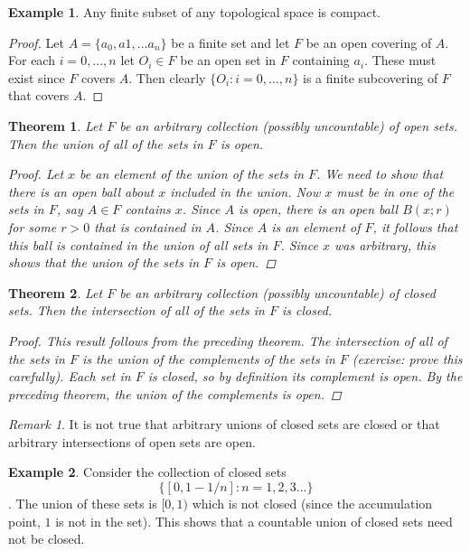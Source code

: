 \documentclass[11pt,a4paper]{report}
\theoremstyle{plain}
\newtheorem{thm}{Theorem}[section]
\theoremstyle{definition}
\newtheorem{exmp}{Example}[section]
\theoremstyle{remark}
\newtheorem*{rem}{Remark}
\begin{document}
\begin{exmp}
Any finite subset of any topological space is compact.
\begin{proof}
Let $A = \{a_0, a1, ... a_n\}$ be a finite set and let $F$ be an open covering of $A$.  For each $i = 0, ..., n$ let $O_i \in F$ be an open set in $F$ containing $a_i$.  These must exist since $F$ covers $A$.  Then clearly $\{O_i \colon i = 0, ..., n\}$ is a finite subcovering of $F$ that covers $A$.
\end{proof}
\end{exmp}
\begin{thm}
Let $F$ be an arbitrary collection (possibly uncountable) of open sets.  Then the union of all of the sets in $F$ is open.
\begin{proof}
Let $x$ be an element of the union of the sets in $F$.  We need to show that there is an open ball about $x$ included in the union. Now $x$ must be in one of the sets in $F$, say $A \in F$ contains $x$.  Since $A$ is open, there is an open ball $B(x;r)$ for some $r>0$ that is contained in $A$. Since $A$ is an element of $F$, it follows that this ball is contained in the union of all sets in $F$.  Since $x$ was arbitrary, this shows that the union of the sets in $F$ is open.
\end{proof}
\end{thm}
\begin{thm}
Let $F$ be an arbitrary collection (possibly uncountable) of closed sets. Then the intersection of all of the sets in $F$ is closed.
\begin{proof}
This result follows from the preceding theorem.  The intersection of all of the sets in $F$ is the union of the complements of the sets in $F$ (exercise: prove this carefully).  Each set in $F$ is closed, so by definition its complement is open.  By the preceding theorem, the union of the complements is open.
\end{proof}
\end{thm}
\begin{rem}
It is not true that arbitrary unions of closed sets are closed or that arbitrary intersections of open sets are open.   
\end{rem}
\begin{exmp}
Consider the collection of closed sets $$\{[0,1 - 1/n] : n = 1,2, 3...\}$$.  The union of these sets is $[0,1)$ which is not closed (since the accumulation point, $1$ is not in the set).  This shows that a countable union of closed sets need not be closed.
\end{exmp}
\end{document}
